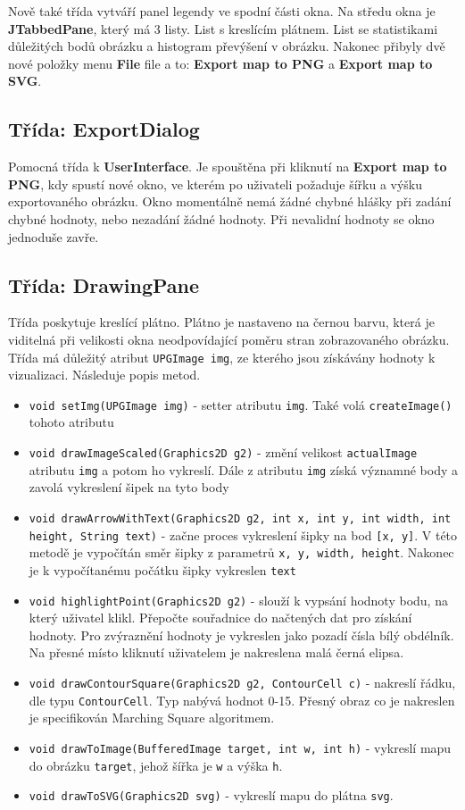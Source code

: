 \documentclass[12pt]{report}
\begin{document}
Nově také třída vytváří panel legendy ve spodní části okna. Na středu okna je \textbf{JTabbedPane}, který 
má 3 listy. List s kreslícím plátnem. List se statistikami důležitých bodů obrázku a histogram převýšení 
v obrázku. Nakonec přibyly dvě nové položky menu \textbf{File} file a to: \textbf{Export map to PNG} a 
\textbf{Export map to SVG}.
\subsection{Třída: ExportDialog}
Pomocná třída k \textbf{UserInterface}. Je spouštěna při kliknutí na \textbf{Export map to PNG}, kdy spustí
nové okno, ve kterém po uživateli požaduje šířku a výšku exportovaného obrázku. Okno momentálně nemá
žádné chybné hlášky při zadání chybné hodnoty, nebo nezadání žádné hodnoty. Při nevalidní hodnoty se okno
jednoduše zavře.
%
\subsection{Třída: DrawingPane}
Třída poskytuje kreslící plátno. Plátno je nastaveno na černou barvu, která je viditelná při velikosti okna
neodpovídající poměru stran zobrazovaného obrázku. Třída má důležitý atribut \texttt{UPGImage img}, ze kterého
jsou získávány hodnoty k vizualizaci. Následuje popis metod.

\begin{itemize}
  \item \texttt{void setImg(UPGImage img)} - setter atributu \texttt{img}. Také volá \texttt{createImage()} tohoto
  	atributu
  \item \texttt{void drawImageScaled(Graphics2D g2)} - změní velikost \texttt{actualImage} atributu \texttt{img}
  	a potom ho vykreslí. Dále z atributu \texttt{img} získá významné body a zavolá vykreslení šipek na tyto body
  \item \texttt{void drawArrowWithText(Graphics2D g2, int x, int y, int width, int height, String text)} - 
  	začne proces vykreslení šipky na bod \texttt{[x, y]}. V této metodě je vypočítán směr šipky z parametrů
	\texttt{x, y, width, height}. Nakonec je k vypočítanému počátku šipky vykreslen \texttt{text}
  \item \texttt{void highlightPoint(Graphics2D g2)} - slouží k vypsání hodnoty bodu, na který uživatel klikl.
  	Přepočte souřadnice do načtených dat pro získání hodnoty. Pro zvýraznění hodnoty je vykreslen jako pozadí
	čísla bílý obdélník. Na přesné místo kliknutí uživatelem je nakreslena malá černá elipsa.
  \item \texttt{void drawContourSquare(Graphics2D g2, ContourCell c)} - nakreslí řádku, dle typu \texttt{ContourCell}.
  	Typ nabývá hodnot 0-15. Přesný obraz co je nakreslen je specifikován Marching Square algoritmem.
  \item \texttt{void drawToImage(BufferedImage target, int w, int h)} - vykreslí mapu do obrázku \texttt{target},
  	jehož šířka je \texttt{w} a výška \texttt{h}.
  \item \texttt{void drawToSVG(Graphics2D svg)} - vykreslí mapu do plátna \texttt{svg}.
\end{itemize}
%
\end{document}
